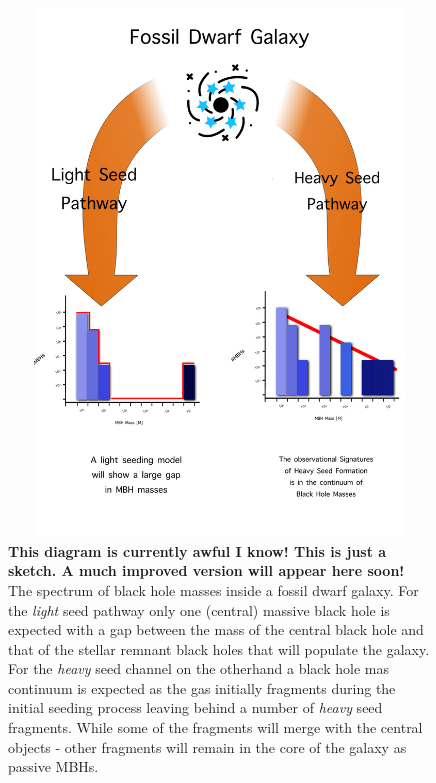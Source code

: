 \documentclass[twocolumn, tighten]{aastex631}
\begin{document}
\begin{figure}
\centering
\begin{minipage}{175mm}      \begin{center}
\centerline{
    \includegraphics[width=18.0cm, height=14cm]{diagramrough.png}}
\caption{\textbf{This diagram is currently awful I know! This is just a sketch. A much improved version will appear here soon!} The spectrum of black hole masses inside a fossil dwarf galaxy. For the \textit{light} seed pathway only one (central) massive black hole is expected with a 
gap between the mass of the central black hole and that of the stellar remnant black holes that will populate the galaxy. For the \textit{heavy} seed channel on the otherhand a 
black hole mas continuum is expected as the gas initially fragments during the initial seeding process leaving behind a number of \textit{heavy} seed fragments. While some of the 
fragments will merge with the central objects - other fragments will remain in the core of the galaxy as passive MBHs.}
\label{Fig:Cartoon}
\end{center} \end{minipage}
\end{figure}
\end{document}
